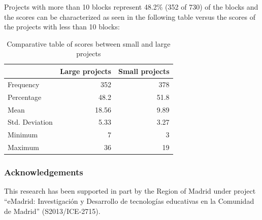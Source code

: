 \documentclass[a4paper]{article}
\begin{document}
Projects with more than 10 blocks represent 48.2\% (352 of 730) of the blocks and the scores can be characterized as seen in the following table versus the scores of the projects with less than 10 blocks:

\begin{table}[ht]
\begin{center}
\caption{Comparative table of scores between small and large projects}

\bigskip

\begin{tabular}{|l|r|r|}
\hline
& Large projects & Small projects \\ \hline
Frequency & 352 & 378\\ \hline
Percentage & 48.2 & 51.8\\ \hline
Mean & 18.56 & 9.89\\ \hline
Std. Deviation & 5.33 & 3.27\\ \hline
Minimum & 7 & 3\\ \hline
Maximum & 36 & 19\\ \hline
\end{tabular}
\end{center}
\end{table}


\subsubsection{Acknowledgements}

This research has been supported in part 
by the Region of Madrid under project ``eMadrid:
Investigación y Desarrollo de tecnologías educativas en la
Comunidad de Madrid'' (S2013/ICE-2715).


 

\end{document}
